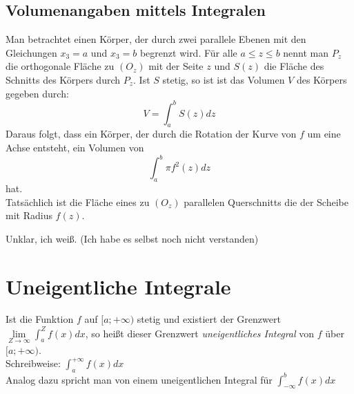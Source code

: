 \subsection{Volumenangaben mittels Integralen}
\begin{Definition}
  Man betrachtet einen Körper, der durch zwei parallele Ebenen mit den Gleichungen $x_3 = a$ und $x_3 = b$ begrenzt wird.
  Für alle $a\leq z \leq b$ nennt man $P_z$ die orthogonale Fläche zu $(O_z)$ mit der Seite $z$ und $S(z)$ die Fläche des
  Schnitts des Körpers durch $P_z$. Ist $S$ stetig, so ist ist das Volumen $V$ des Körpers gegeben durch:
  $$V=\int_a^b S(z)dz$$
  Daraus folgt, dass ein Körper, der durch die Rotation der Kurve von $f$ um eine Achse entsteht, ein Volumen von
  $$\int_a^b \pi f^2(z)dz$$
  hat.\\
  Tatsächlich ist die Fläche eines zu $(O_z)$ parallelen Querschnitts die der Scheibe mit Radius $f(z)$.
\end{Definition}
Unklar, ich weiß. (Ich habe es selbst noch nicht verstanden)
\section{Uneigentliche Integrale}
\begin{Definition}
  Ist die Funktion $f$ auf $[a;+\infty)$ stetig und existiert der Grenzwert $\lim\limits_{Z \rightarrow \infty} \int_a^Z f(x)dx$,
  so heißt dieser Grenzwert \emph{uneigentliches Integral} von $f$ über $[a;+\infty)$.\\
  Schreibweise: $\int_a^{+\infty} f(x)dx$\\
  Analog dazu spricht man von einem uneigentlichen Integral für $\int_{-\infty}^b f(x)dx$
\end{Definition}
